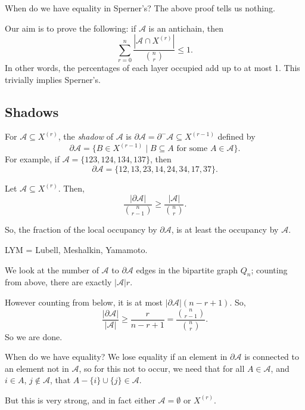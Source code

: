 \documentclass[12pt]{article}
\begin{document}
When do we have equality in Sperner's? The above proof tells us nothing.

Our aim is to prove the following: if $\mathcal{A}$ is an antichain, then
\[
\sum_{r = 0}^n \frac{|\mathcal{A} \cap X^{(r)}|}{\binom nr} \leq 1.
\]
In other words, the percentages of each layer occupied add up to at most 1. This trivially implies Sperner's.

\subsection{Shadows}%
\label{sub:shadow}

For $\mathcal{A} \subseteq X^{(r)}$, the \emph{shadow} of $\mathcal{A}$ is $\partial \mathcal{A} = \partial^- \mathcal{A} \subseteq X^{(r - 1)}$ defined by
\[
	\partial \mathcal{A} = \{ B \in X^{(r-1)} \mid B \subseteq A \text{ for some } A \in \mathcal{A}\}.
\]
For example, if $\mathcal{A} = \{123, 124, 134, 137\}$, then
\[
	\partial \mathcal{A} = \{12, 13, 23, 14, 24, 34, 17, 37\}.
\]

\begin{proposition}
	Let $\mathcal{A} \subseteq X^{(r)}$. Then,
	\[
		\frac{|\partial \mathcal{A}|}{\binom{n}{r-1}} \geq \frac{|\mathcal{A}|}{\binom{n}{r}}.
	\]
\end{proposition}

So, the fraction of the local occupancy by $\partial \mathcal{A}$, is at least the occupancy by $\mathcal{A}$.

\begin{remark}
	LYM = Lubell, Meshalkin, Yamamoto.
\end{remark}

\begin{proofbox}
	We look at the number of $\mathcal{A}$ to $\partial \mathcal{A}$ edges in the bipartite graph $Q_n$; counting from above, there are exactly $|\mathcal{A}| r$.

	However counting from below, it is at most $|\partial \mathcal{A}|(n - r + 1)$. So,
	\[
		\frac{|\partial \mathcal{A}|}{|\mathcal{A}|} \geq \frac{r}{n - r + 1} = \frac{\binom n{r-1}}{\binom nr}.
	\]
	So we are done.
\end{proofbox}

\begin{remark}
	When do we have equality? We lose equality if an element in $\partial \mathcal{A}$ is connected to an element not in $\mathcal{A}$, so for this not to occur, we need that for all $A \in \mathcal{A}$, and $i \in A$, $j \not \in \mathcal{A}$, that $A - \{i\} \cup \{j\} \in \mathcal{A}$.

	But this is very strong, and in fact either $\mathcal{A} = \emptyset$ or $X^{(r)}$.
\end{remark}
\end{document}
